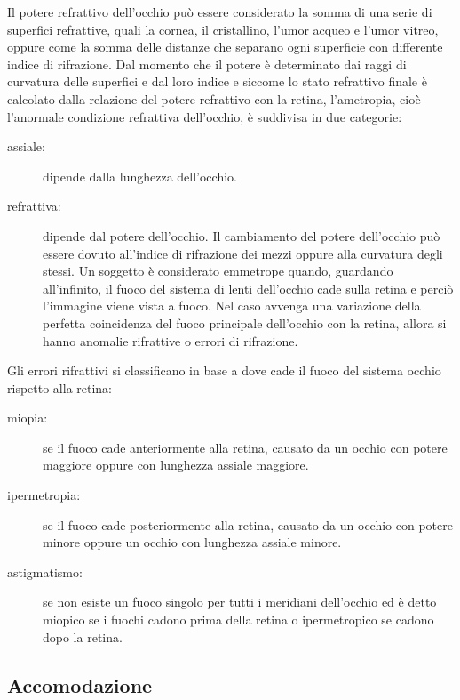 Il potere refrattivo dell’occhio può essere considerato la somma di una serie di superfici refrattive, quali la cornea, il cristallino, l’umor acqueo e l’umor vitreo, oppure come la somma delle distanze che separano ogni superficie con differente indice di rifrazione. Dal momento che il potere è determinato dai raggi di curvatura delle superfici e dal loro indice e siccome lo stato refrattivo finale è calcolato dalla relazione del potere refrattivo con la retina, l’ametropia, cioè l’anormale condizione refrattiva dell’occhio, è suddivisa in due categorie:
 \begin{description} 
 \item[assiale:]dipende dalla lunghezza dell’occhio. 
 \item[refrattiva:]dipende dal potere dell’occhio. Il cambiamento del potere dell’occhio può essere dovuto all’indice di rifrazione dei mezzi oppure alla curvatura degli stessi.
Un soggetto è considerato emmetrope quando, guardando all’infinito, il fuoco del sistema di lenti dell’occhio cade sulla retina e perciò l’immagine viene vista a fuoco. Nel caso avvenga una variazione della perfetta coincidenza del fuoco principale dell’occhio con la retina, allora si hanno anomalie rifrattive o errori di rifrazione.
\end{description}
Gli errori rifrattivi si classificano in base a dove cade il fuoco del sistema occhio rispetto alla retina:
 \begin{description}
 \item[miopia:]se il fuoco cade anteriormente alla retina, causato da un occhio con potere maggiore oppure con lunghezza assiale maggiore.
 \item[ipermetropia:]se il fuoco cade posteriormente alla retina, causato da un occhio con potere minore oppure un occhio con lunghezza assiale minore.
 \item[astigmatismo:]se non esiste un fuoco singolo per tutti i meridiani dell’occhio ed è detto miopico se i fuochi cadono prima della retina o ipermetropico se cadono dopo la retina\cite{bib18}.
\end{description}


\subsection{Accomodazione}

